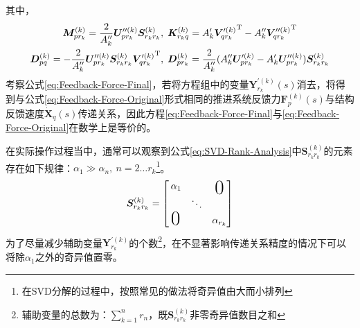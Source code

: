 其中，
\begin{displaymath}
  \begin{aligned}
    \boldsymbol{M}_{pr_k}^{(k)}=\frac{2}{A''_k} \boldsymbol{U}_{pr_k}^{\prime\prime(k)} \boldsymbol{S}_{r_kr_k}^{(k)}                                          & , \; \boldsymbol{K}_{r_kq}^{(k)}= {A'_k} {\boldsymbol{V}_{qr_k}^{\prime(k)}}^{\mathrm{T}}- {A''_k}{\boldsymbol{V}_{qr_k}^{\prime\prime(k)}}^{\mathrm{T}}                             \\
    \boldsymbol{D}_{pq}^{(k)}=-\frac{2}{A''_k} \boldsymbol{U}_{pr_k}^{\prime\prime(k)} \boldsymbol{S}_{r_kr_k}^{(k)} {\boldsymbol{V}_{qr_k}^{\prime(k)}}^{\mathrm{T}} & , \; \boldsymbol{D}_{pr_k}^{(k)}=\frac{2}{A''_k}(A''_{k}\boldsymbol{U}_{pr_k}^{\prime(k)}- {A'_k}\boldsymbol{U}_{pr_k}^{\prime\prime(k)})\boldsymbol{S}_{r_kr_k}^{(k)}
  \end{aligned}
\end{displaymath}
考察公式\eqref{eq:Feedback-Force-Final}，若将方程组中的变量$\boldsymbol{Y}_{r_k}^{\prime(k)}(s)$消去，将得到与公式\eqref{eq:Feedback-Force-Original}形式相同的推进系统反馈力$\boldsymbol{F}_p^{(k)}(s)$与结构反馈速度$\dot{\boldsymbol{X}}_q(s)$传递关系，因此方程\eqref{eq:Feedback-Force-Final}与\eqref{eq:Feedback-Force-Original}在数学上是等价的。

在实际操作过程当中，通常可以观察到公式\eqref{eq:SVD-Rank-Analysis}中$\boldsymbol{S}_{r_kr_k}^{(k)}$的元素存在如下规律：$\alpha_1\gg\alpha_n,\ n=2\dots r_k$\footnote{在SVD分解的过程中，按照常见的做法将奇异值由大而小排列}。
\begin{displaymath}
  \boldsymbol{S}_{r_kr_k}^{(k)}= \begin{bmatrix}
    \rule{2pt}{0ex}\alpha_1                                           &        & \text{\raisebox{-1.2ex}{\makebox[0pt][c]{\huge0}}} \\[0em]
                                                                      & \ddots &                                                    \\[0em]
    \text{\rule{1pt}{0ex}\raisebox{-0.4ex}{\makebox[0pt][c]{\huge0}}} &        & \alpha_{r_k}                                       \\[0em]
  \end{bmatrix}
\end{displaymath}
为了尽量减少辅助变量$\boldsymbol{Y}_{r_k}^{\prime(k)}$的个数\footnote{辅助变量的总数为：$\sum_{k=1}^n r_n$，既$\boldsymbol{S}_{r_kr_k}^{(k)}$非零奇异值数目之和}，在不显著影响传递关系精度的情况下可以将除$\alpha_1$之外的奇异值置零。

